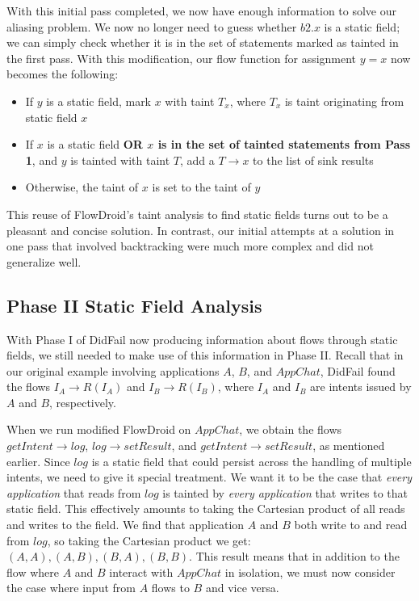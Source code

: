 With this initial pass completed, we now have enough information to solve our aliasing problem. We now no longer need to guess whether $b2.x$ is a static field; we can simply check whether it is in the set of statements marked as tainted in the first pass. With this modification, our flow function for assignment $y = x$ now becomes the following:

\begin{itemize}
\item If $y$ is a static field, mark $x$ with taint $T_x$, where $T_x$ is taint originating from static field $x$
\item If $x$ is a static field \textbf{OR $x$ is in the set of tainted statements from Pass 1}, and $y$ is tainted with taint $T$, add a $T\rightarrow x$ to the list of sink results
\item Otherwise, the taint of $x$ is set to the taint of $y$
\end{itemize}

This reuse of FlowDroid's taint analysis to find static fields turns out to be a pleasant and concise solution. In contrast, our initial attempts at a solution in one pass that involved backtracking were much more complex and did not generalize well.

\subsection{Phase II Static Field Analysis}
\label{sec:staticphase2}

With Phase I of DidFail now producing information about flows through static fields, we still needed to make use of this information in Phase II. Recall that in our original example involving applications $A$, $B$, and $AppChat$, DidFail found the flows $I_A\rightarrow R(I_A)$ and $I_B\rightarrow R(I_B)$, where $I_A$ and $I_B$ are intents issued by $A$ and $B$, respectively. 

When we run modified FlowDroid on $AppChat$, we obtain the flows $getIntent\rightarrow log$, $log\rightarrow setResult$, and $getIntent\rightarrow setResult$, as mentioned earlier. Since $log$ is a static field that could persist across the handling of multiple intents, we need to give it special treatment. We want it to be the case that \emph{every application} that reads from $log$ is tainted by \emph{every application} that writes to that static field. This effectively amounts to taking the Cartesian product of all reads and writes to the field. We find that application $A$ and $B$ both write to and read from $log$, so taking the Cartesian product we get: $(A, A), (A, B), (B, A), (B, B)$. This result means that in addition to the flow where $A$ and $B$ interact with $AppChat$ in isolation, we must now consider the case where input from $A$ flows to $B$ and vice versa.

